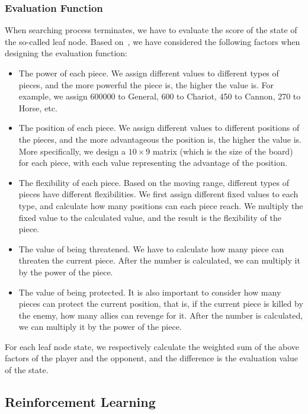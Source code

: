 \documentclass[letterpaper]{article}
\begin{document}
\subsubsection*{Evaluation Function} When searching process terminates, we have to evaluate the score of the state of the so-called leaf node.
Based on~\cite{yen2004computer}, we have considered the following factors when designing the evaluation function:
\begin{itemize}
    \item The power of each piece.
    We assign different values to different types of pieces, and the more powerful the piece is, the higher the value is.
    For example, we assign 600000 to General, 600 to Chariot, 450 to Cannon, 270 to Horse, etc.
    \item The position of each piece.
    We assign different values to different positions of the pieces, and the more advantageous the position is, the higher the value is.
    More specifically, we design a $10\times 9$ matrix (which is the size of the board) for each piece, with each value
    representing the advantage of the position.
    \item The flexibility of each piece.
    Based on the moving range, different types of pieces have different flexibilities.
    We first assign different fixed values to each type, and calculate how many positions can each piece reach.
    We multiply the fixed value to the calculated value, and the result is the flexibility of the piece.
    \item The value of being threatened.
    We have to calculate how many piece can threaten the current piece.
    After the number is calculated, we can multiply it by the power of the piece.
    \item The value of being protected.
    It is also important to consider how many pieces can protect the current position, that is, if the current piece is killed by the enemy, how many allies can revenge for it.
    After the number is calculated, we can multiply it by the power of the piece.
\end{itemize}
For each leaf node state, we respectively calculate the weighted sum of the above factors of the player and the opponent, and the difference is the evaluation value of the state.

\subsection{Reinforcement Learning}\label{subsec:reinforcement-learning}
\end{document}
